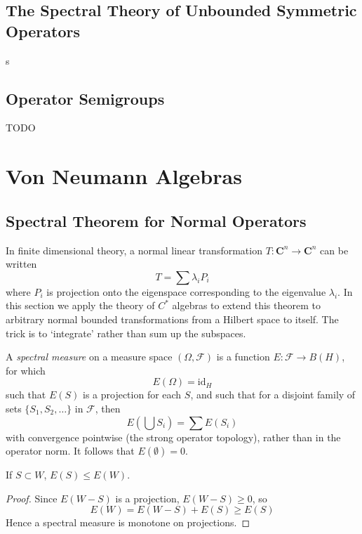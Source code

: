 \section{The Spectral Theory of Unbounded Symmetric Operators}

s






\section{Operator Semigroups}

TODO






\chapter{Von Neumann Algebras}





\section{Spectral Theorem for Normal Operators}

In finite dimensional theory, a normal linear transformation $T: \mathbf{C}^n \to \mathbf{C}^n$ can be written
%
\[ T = \sum \lambda_i P_i \]
%
where $P_i$ is projection onto the eigenspace corresponding to the eigenvalue $\lambda_i$. In this section we apply the theory of $C^*$ algebras to extend this theorem to arbitrary normal bounded transformations from a Hilbert space to itself. The trick is to `integrate' rather than sum up the subspaces.

A \emph{spectral measure} on a measure space $(\Omega, \mathcal{F})$ is a function $E: \mathcal{F} \to B(H)$, for which
%
\[ E(\Omega) = \text{id}_H \]
%
such that $E(S)$ is a projection for each $S$, and such that for a disjoint family of sets $\{ S_1, S_2, \dots \}$ in $\mathcal{F}$, then
%
\[ E \left( \bigcup S_i \right) = \sum E(S_i) \]
%
with convergence pointwise (the strong operator topology), rather than in the operator norm. It follows that $E(\emptyset) = 0$.

\begin{lemma}
    If $S \subset W$, $E(S) \leq E(W)$.
\end{lemma}
\begin{proof}
    Since $E(W - S)$ is a projection, $E(W - S) \geq 0$, so
    \[ E(W) = E(W - S) + E(S) \geq E(S) \]
    Hence a spectral measure is monotone on projections.
\end{proof}

